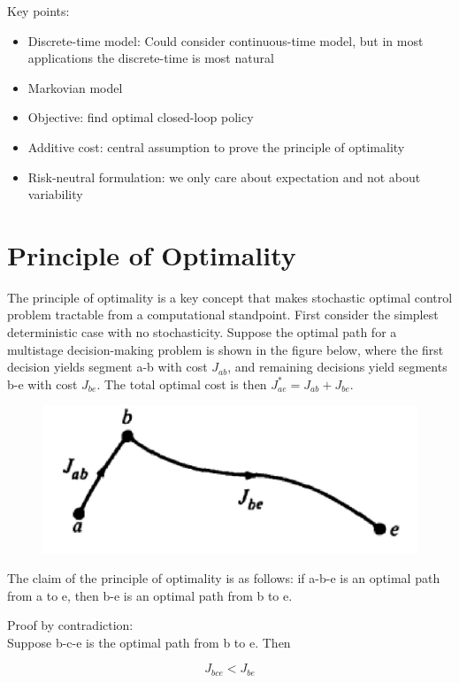 \documentclass[twoside]{article}
\begin{document}
Key points:
\begin{itemize}
    \item Discrete-time model: Could consider continuous-time model, but in most applications the discrete-time is most natural
    \item Markovian model
    \item Objective: find optimal closed-loop policy
    \item Additive cost: central assumption to prove the principle of optimality
    \item Risk-neutral formulation: we only care about expectation and not about variability
\end{itemize}

\section{Principle of Optimality}
The principle of optimality is a key concept that makes stochastic optimal control problem tractable from a computational standpoint. First consider the simplest deterministic case with no stochasticity. Suppose the optimal path for a multistage decision-making problem is shown in the figure below, where the first decision yields segment a-b with cost $J_{ab}$, and remaining decisions yield segments b-e with cost $J_{be}$. The total optimal cost is then $J_{ae}^* = J_{ab} + J_{be}$.

\begin{figure}[!htb]
  \centering
  \includegraphics[scale=0.6]{path.PNG}
\end{figure}

The claim of the principle of optimality is as follows: if a-b-e is an optimal path from a to e, then b-e is an optimal path from b to e.

Proof by contradiction: \\
Suppose b-c-e is the optimal path from b to e. Then

\begin{equation*}
    J_{bce} < J_{be}
\end{equation*}
\end{document}
